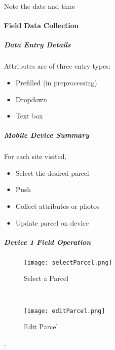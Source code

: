  \vspace{4in}

 {\smallbtn Note the date and time}
 \vspace{1in}



 \clearpage

 \paragraph{Field Data Collection}
 
 \subparagraph{Data Entry Details}

 Attributes are of three entry types:
 \begin{itemize}
 \item Prefilled {\scriptsize (in preprocessing)}
 \item Dropdown
 \item Text box
 \end{itemize}
 \vspace{1in}

 \subparagraph{Mobile Device Summary}

 For each site visited,

 \begin{itemize}
 \item Select the desired parcel
 \item Push 
 \item Collect attributes or photos
 \item Update parcel on device
 \end{itemize}

 \clearpage


 \subparagraph{Device 1 Field Operation}

 \begin{wrapfigure}{r}{0.5\textwidth}
 \centering
     \texttt{[image: selectParcel.png]}
 \vspace{-.1in}
 
 \caption {Select a Parcel}
 \vspace{.1in}

 \HRule \\[.4cm] %
 \vspace{.1in}

 \centering
     \texttt{[image: editParcel.png]}
     \vspace{-.1in}
     
 \caption{Edit Parcel}
 \end{wrapfigure}
 .
 \vspace{2in}

